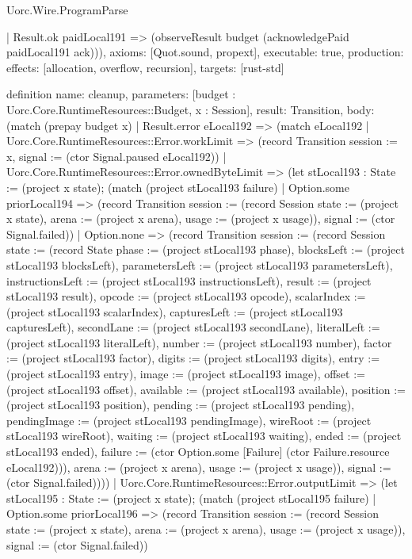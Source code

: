 \begin{lexlean}{Uorc.Wire.ProgramParse}
\begin{semanticmodule}
{    | Result.ok paidLocal191 => (observeResult budget (acknowledgePaid paidLocal191 ack))),
  axioms: [Quot.sound, propext],
  executable: true,
  production: {effects: [allocation, overflow, recursion], targets: [rust-std]}
}

definition{
  name: cleanup,
  parameters: [budget : Uorc.Core.RuntimeResources::Budget, x : Session],
  result: Transition,
  body: (match (prepay budget x)
    | Result.error eLocal192 => (match eLocal192
      | Uorc.Core.RuntimeResources::Error.workLimit => (record Transition {session := x, signal := (ctor Signal.paused eLocal192)})
      | Uorc.Core.RuntimeResources::Error.ownedByteLimit => (let stLocal193 : State := (project x state); (match (project stLocal193 failure)
        | Option.some priorLocal194 => (record Transition {session := (record Session {state := (project x state), arena := (project x arena), usage := (project x usage)}), signal := (ctor Signal.failed)})
        | Option.none => (record Transition {session := (record Session {state := (record State {phase := (project stLocal193 phase), blocksLeft := (project stLocal193 blocksLeft), parametersLeft := (project stLocal193 parametersLeft), instructionsLeft := (project stLocal193 instructionsLeft), result := (project stLocal193 result), opcode := (project stLocal193 opcode), scalarIndex := (project stLocal193 scalarIndex), capturesLeft := (project stLocal193 capturesLeft), secondLane := (project stLocal193 secondLane), literalLeft := (project stLocal193 literalLeft), number := (project stLocal193 number), factor := (project stLocal193 factor), digits := (project stLocal193 digits), entry := (project stLocal193 entry), image := (project stLocal193 image), offset := (project stLocal193 offset), available := (project stLocal193 available), position := (project stLocal193 position), pending := (project stLocal193 pending), pendingImage := (project stLocal193 pendingImage), wireRoot := (project stLocal193 wireRoot), waiting := (project stLocal193 waiting), ended := (project stLocal193 ended), failure := (ctor Option.some [Failure] (ctor Failure.resource eLocal192))}), arena := (project x arena), usage := (project x usage)}), signal := (ctor Signal.failed)})))
      | Uorc.Core.RuntimeResources::Error.outputLimit => (let stLocal195 : State := (project x state); (match (project stLocal195 failure)
        | Option.some priorLocal196 => (record Transition {session := (record Session {state := (project x state), arena := (project x arena), usage := (project x usage)}), signal := (ctor Signal.failed)})
}
\end{semanticmodule}
\end{lexlean}
